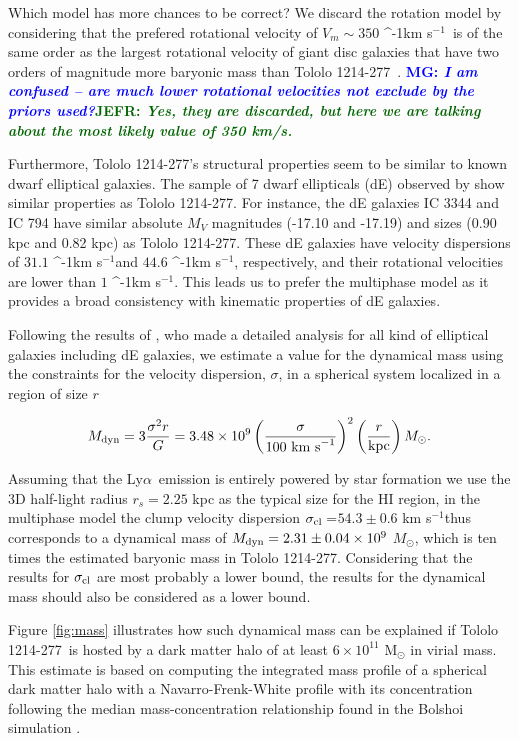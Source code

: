 \documentclass[a4,useAMS,usenatbib,usegraphicx]{mn2e}
\newcommand{\tol}{Tololo 1214-277}
\newcommand{\lya}{\ifmmode{{\rm Ly}\alpha}\else Ly$\alpha$\ \fi}
\newcommand{\kms}{\ifmmode\mathrm{km\ s}^{-1}\else km s$^{-1}$\fi}
\newcommand{\sigmaclump}{$54.3\pm 0.6$ km s$^{-1}$}
\newcommand{\mg}[1]{\textcolor{blue}{\bf MG: \textit{#1}}}
\newcommand{\jefr}[1]{\textcolor{darkgreen}{\bf JEFR: \textit{#1}}}
\begin{document}
Which model has more
chances to be correct?  
We discard the rotation model by considering that the prefered rotational
velocity of $V_{m}\sim350$ \kms\ is of the same order as the largest rotational velocity of giant
disc galaxies that have two orders of magnitude more baryonic mass
than \tol\ \citep{2015MNRAS.448.1767C}. 
\mg{I am confused -- are much lower rotational
  velocities not exclude by the priors used?}\jefr{Yes, they are
  discarded, but here we are talking about the most likely value of
  350 km/s.}

Furthermore, \tol's structural properties seem to be similar to known dwarf
elliptical galaxies. 
The sample of 7 dwarf ellipticals (dE) observed by
\cite{2003AJ....126.1794G} show similar properties as \tol. 
For instance, the dE galaxies IC 3344 and IC 794 have similar absolute $M_V$
magnitudes (-17.10 and -17.19) and sizes (0.90 kpc and 0.82 kpc) as
\tol. 
These dE galaxies have velocity dispersions of $31.1$ \kms and
$44.6$ \kms, respectively,  and their rotational velocities are lower
than $1$ \kms.  
This leads us to prefer the multiphase model as it provides 
a broad consistency with kinematic properties of dE galaxies.

 
Following the results of \cite{2011ApJ...726..108T}, who made a
detailed analysis for all kind of elliptical galaxies including dE galaxies, we
estimate a value for the dynamical mass using the constraints for
the velocity dispersion, $\sigma$,  in a spherical system localized in a
region of size $r$   


\begin{equation}
M_{\rm dyn} = 3 \frac{\sigma ^{2}r}{G} = 3.48\times10^{9}
\left(\frac{\sigma}{100\ \mathrm{km\ s}^{-1}}\right)^2\left(\frac{r}{\mathrm{kpc}}\right)
M_{\odot}. 
\end{equation}

Assuming that the \lya emission is entirely powered by star formation 
we use the 3D half-light radius $r_s=2.25$ kpc as the typical size
for the HI region, in the multiphase model the clump velocity dispersion
$\sigma_{\rm{cl}}=$\sigmaclump thus corresponds to a dynamical mass of
$M_{\rm dyn}=2.31\pm0.04 \times 10^{9}$ $M_{\odot}$, which is ten
times the estimated baryonic mass in \tol.
Considering that the results for $\sigma_{\rm{cl}}$ are most probably
a lower bound, the results for the dynamical mass should also be
considered as a lower bound. 

Figure \ref{fig:mass} illustrates  how such dynamical
mass can be explained if \tol\ is hosted by a dark matter halo of at
least $6\times 10^{11}$ M$_{\odot}$ in virial mass. 
This estimate is based on computing the integrated mass profile of a
spherical dark matter halo with a Navarro-Frenk-White profile with its
concentration following the median mass-concentration
relationship found in the Bolshoi simulation
\citep{2012MNRAS.423.3018P,2016ApJ...832..169P}.  
\end{document}

